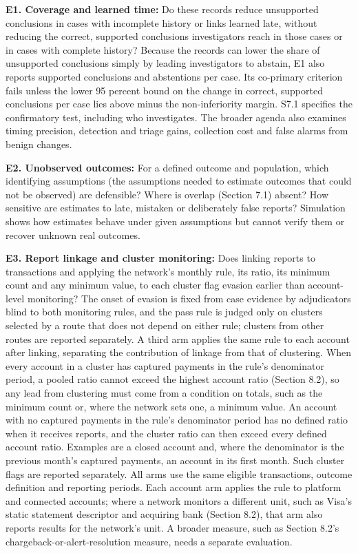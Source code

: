 \documentclass[
  11pt,
]{article}
\begin{document}
\textbf{E1. Coverage and learned time:} Do these records reduce
unsupported conclusions in cases with incomplete history or links
learned late, without reducing the correct, supported conclusions
investigators reach in those cases or in cases with complete history?
Because the records can lower the share of unsupported conclusions
simply by leading investigators to abstain, E1 also reports supported
conclusions and abstentions per case. Its co-primary criterion fails
unless the lower 95 percent bound on the change in correct, supported
conclusions per case lies above minus the non-inferiority margin. S7.1
specifies the confirmatory test, including who investigates. The broader
agenda also examines timing precision, detection and triage gains,
collection cost and false alarms from benign changes.

\textbf{E2. Unobserved outcomes:} For a defined outcome and population,
which identifying assumptions (the assumptions needed to estimate
outcomes that could not be observed) are defensible? Where is overlap
(Section 7.1) absent? How sensitive are estimates to late, mistaken or
deliberately false reports? Simulation shows how estimates behave under
given assumptions but cannot verify them or recover unknown real
outcomes.

\textbf{E3. Report linkage and cluster monitoring:} Does linking reports
to transactions and applying the network's monthly rule, its ratio, its
minimum count and any minimum value, to each cluster flag evasion
earlier than account-level monitoring? The onset of evasion is fixed
from case evidence by adjudicators blind to both monitoring rules, and
the pass rule is judged only on clusters selected by a route that does
not depend on either rule; clusters from other routes are reported
separately. A third arm applies the same rule to each account after
linking, separating the contribution of linkage from that of clustering.
When every account in a cluster has captured payments in the rule's
denominator period, a pooled ratio cannot exceed the highest account
ratio (Section 8.2), so any lead from clustering must come from a
condition on totals, such as the minimum count or, where the network
sets one, a minimum value. An account with no captured payments in the
rule's denominator period has no defined ratio when it receives reports,
and the cluster ratio can then exceed every defined account ratio.
Examples are a closed account and, where the denominator is the previous
month's captured payments, an account in its first month. Such cluster
flags are reported separately. All arms use the same eligible
transactions, outcome definition and reporting periods. Each account arm
applies the rule to platform and connected accounts; where a network
monitors a different unit, such as Visa's static statement descriptor
and acquiring bank (Section 8.2), that arm also reports results for the
network's unit. A broader measure, such as Section 8.2's
chargeback-or-alert-resolution measure, needs a separate evaluation.
\end{document}

